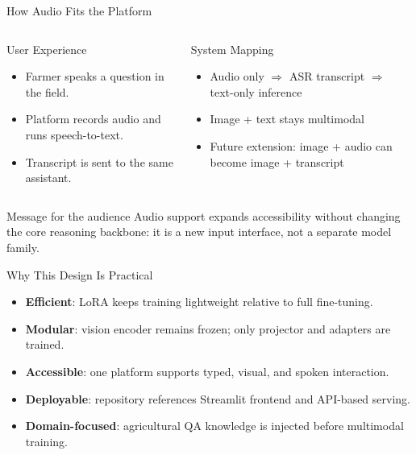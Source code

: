 \documentclass[aspectratio=169,11pt]{beamer}
\begin{document}
\begin{frame}{How Audio Fits the Platform}
\begin{columns}[T]
    \begin{block}{User Experience}
    \begin{itemize}
        \item Farmer speaks a question in the field.
        \item Platform records audio and runs speech-to-text.
        \item Transcript is sent to the same assistant.
    \end{itemize}
    \end{block}

    \begin{block}{System Mapping}
    \begin{itemize}
        \item Audio only $\Rightarrow$ ASR transcript $\Rightarrow$ text-only inference
        \item Image + text stays multimodal
        \item Future extension: image + audio can become image + transcript
    \end{itemize}
    \end{block}
\end{columns}
\vspace{0.4em}
\begin{alertblock}{Message for the audience}
Audio support expands accessibility without changing the core reasoning backbone: it is a new input interface, not a separate model family.
\end{alertblock}
\end{frame}

\begin{frame}{Why This Design Is Practical}
\begin{itemize}
    \item \textbf{Efficient}: LoRA keeps training lightweight relative to full fine-tuning.
    \item \textbf{Modular}: vision encoder remains frozen; only projector and adapters are trained.
    \item \textbf{Accessible}: one platform supports typed, visual, and spoken interaction.
    \item \textbf{Deployable}: repository references Streamlit frontend and API-based serving.
    \item \textbf{Domain-focused}: agricultural QA knowledge is injected before multimodal training.
\end{itemize}
\end{frame}
\end{document}
